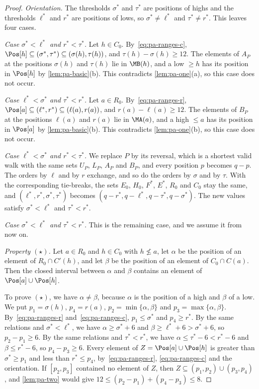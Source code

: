 \begin{proof}
\emph{Orientation.}
The thresholds $\sigma^*$ and $\tau^*$ are positions of highs and the thresholds $\ell^*$ and $r^*$ are positions of lows, so $\sigma^* \neq \ell^*$ and $\tau^* \neq r^*$.
This leaves four cases.

\emph{Case $\sigma^* < \ell^*$ and $r^* < \tau^*$.}
Let $h \in C_0$.
By~\eqref{eq:pa-ranges-c}, $\Pos[h] \subseteq (\sigma^*, \tau^*) \subseteq (\sigma(h), \tau(h))$, and $\tau(h) - \sigma(h) \geq 12$.
The elements of $A_P$ at the positions $\sigma(h)$ and $\tau(h)$ lie in $\MB(h)$, and a low $\geq h$ has its position in $\Pos[h]$ by \cref{lem:pa-basic}(b).
This contradicts \cref{lem:pa-one}(a), so this case does not occur.

\emph{Case $\ell^* < \sigma^*$ and $\tau^* < r^*$.}
Let $a \in R_0$.
By~\eqref{eq:pa-ranges-r}, $\Pos[a] \subseteq (\ell^*, r^*) \subseteq (\ell(a), r(a))$, and $r(a) - \ell(a) \geq 12$.
The elements of $B_P$ at the positions $\ell(a)$ and $r(a)$ lie in $\MA(a)$, and a high $\leq a$ has its position in $\Pos[a]$ by \cref{lem:pa-basic}(b).
This contradicts \cref{lem:pa-one}(b), so this case does not occur.

\emph{Case $\ell^* < \sigma^*$ and $r^* < \tau^*$.}
We replace $P$ by its reversal, which is a shortest valid walk with the same sets $U_P$, $L_P$, $A_P$ and $B_P$, and every position $p$ becomes $q - p$.
The orders by $\ell$ and by $r$ exchange, and so do the orders by $\sigma$ and by $\tau$.
With the corresponding tie-breaks, the sets $E_0$, $H_0$, $F^*$, $E^*$, $R_0$ and $C_0$ stay the same, and $(\ell^*, r^*, \sigma^*, \tau^*)$ becomes $(q - r^*, q - \ell^*, q - \tau^*, q - \sigma^*)$.
The new values satisfy $\sigma^* < \ell^*$ and $\tau^* < r^*$.

\emph{Case $\sigma^* < \ell^*$ and $\tau^* < r^*$.}
This is the remaining case, and we assume it from now on.

\emph{Property $(\star)$.}
Let $a \in R_0$ and $h \in C_0$ with $h \not\leq a$, let $\alpha$ be the position of an element of $R_0 \cap C'(h)$, and let $\beta$ be the position of an element of $C_0 \cap C(a)$.
Then the closed interval between $\alpha$ and $\beta$ contains an element of $\Pos[a] \cup \Pos[h]$.

To prove $(\star)$, we have $\alpha \neq \beta$, because $\alpha$ is the position of a high and $\beta$ of a low.
We put $p_1 = \sigma(h)$, $p_4 = r(a)$, $p_2 = \min\{\alpha, \beta\}$ and $p_3 = \max\{\alpha, \beta\}$.
By~\eqref{eq:pa-ranges-r} and~\eqref{eq:pa-ranges-c}, $p_1 \leq \sigma^*$ and $p_4 \geq r^*$.
By the same relations and $\sigma^* < \ell^*$, we have $\alpha \geq \sigma^* + 6$ and $\beta \geq \ell^* + 6 > \sigma^* + 6$, so $p_2 - p_1 \geq 6$.
By the same relations and $\tau^* < r^*$, we have $\alpha \leq \tau^* - 6 < r^* - 6$ and $\beta \leq r^* - 6$, so $p_4 - p_3 \geq 6$.
Every element of $Z = \Pos[a] \cup \Pos[h]$ is greater than $\sigma^* \geq p_1$ and less than $r^* \leq p_4$, by~\eqref{eq:pa-ranges-r}, \eqref{eq:pa-ranges-c} and the orientation.
If $[p_2, p_3]$ contained no element of $Z$, then $Z \subseteq (p_1, p_2) \cup (p_3, p_4)$, and \cref{lem:pa-two} would give $12 \leq (p_2 - p_1) + (p_4 - p_3) \leq 8$.


\end{proof}

